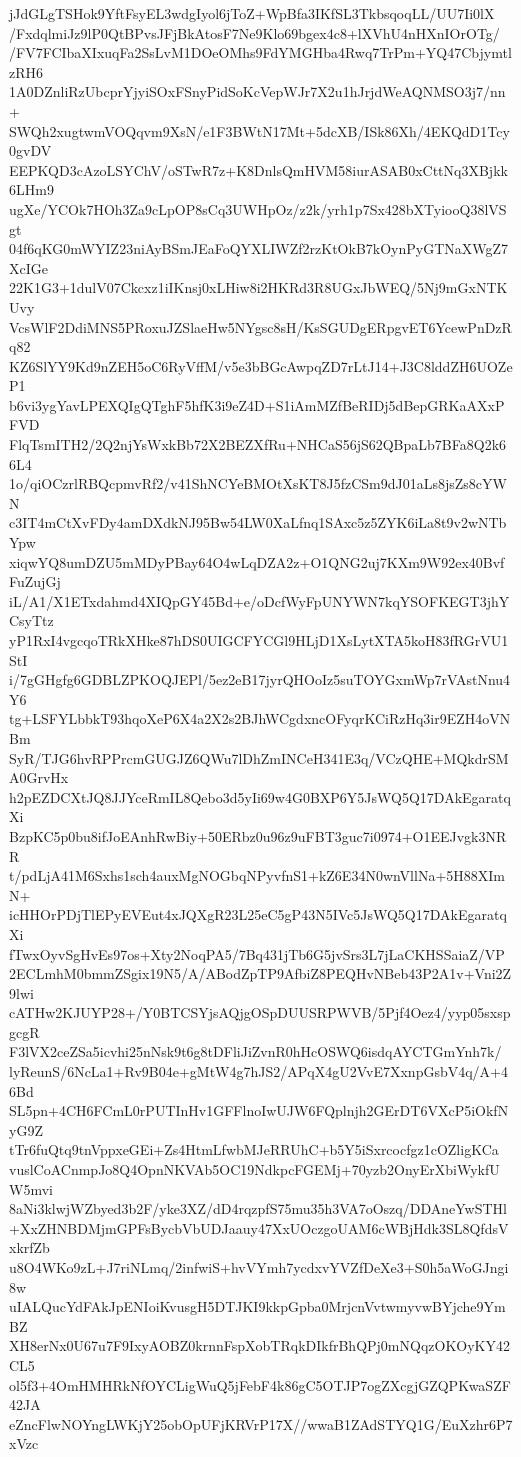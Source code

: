 jJdGLgTSHok9YftFsyEL3wdgIyol6jToZ+WpBfa3IKfSL3TkbsqoqLL/UU7Ii0lX
/FxdqlmiJz9lP0QtBPvsJFjBkAtosF7Ne9Klo69bgex4c8+lXVhU4nHXnIOrOTg/
/FV7FCIbaXIxuqFa2SsLvM1DOeOMhs9FdYMGHba4Rwq7TrPm+YQ47CbjymtlzRH6
1A0DZnliRzUbcprYjyiSOxFSnyPidSoKcVepWJr7X2u1hJrjdWeAQNMSO3j7/nn+
SWQh2xugtwmVOQqvm9XsN/e1F3BWtN17Mt+5dcXB/ISk86Xh/4EKQdD1Tcy0gvDV
EEPKQD3cAzoLSYChV/oSTwR7z+K8DnlsQmHVM58iurASAB0xCttNq3XBjkk6LHm9
ugXe/YCOk7HOh3Za9cLpOP8sCq3UWHpOz/z2k/yrh1p7Sx428bXTyiooQ38lVSgt
04f6qKG0mWYIZ23niAyBSmJEaFoQYXLIWZf2rzKtOkB7kOynPyGTNaXWgZ7XcIGe
22K1G3+1dulV07Ckcxz1iIKnsj0xLHiw8i2HKRd3R8UGxJbWEQ/5Nj9mGxNTKUvy
VcsWlF2DdiMNS5PRoxuJZSlaeHw5NYgsc8sH/KsSGUDgERpgvET6YcewPnDzRq82
KZ6SlYY9Kd9nZEH5oC6RyVffM/v5e3bBGcAwpqZD7rLtJ14+J3C8lddZH6UOZeP1
b6vi3ygYavLPEXQIgQTghF5hfK3i9eZ4D+S1iAmMZfBeRIDj5dBepGRKaAXxPFVD
FlqTsmITH2/2Q2njYsWxkBb72X2BEZXfRu+NHCaS56jS62QBpaLb7BFa8Q2k66L4
1o/qiOCzrlRBQcpmvRf2/v41ShNCYeBMOtXsKT8J5fzCSm9dJ01aLs8jsZs8cYWN
c3IT4mCtXvFDy4amDXdkNJ95Bw54LW0XaLfnq1SAxc5z5ZYK6iLa8t9v2wNTbYpw
xiqwYQ8umDZU5mMDyPBay64O4wLqDZA2z+O1QNG2uj7KXm9W92ex40BvfFuZujGj
iL/A1/X1ETxdahmd4XIQpGY45Bd+e/oDcfWyFpUNYWN7kqYSOFKEGT3jhYCsyTtz
yP1RxI4vgcqoTRkXHke87hDS0UIGCFYCGl9HLjD1XsLytXTA5koH83fRGrVU1StI
i/7gGHgfg6GDBLZPKOQJEPl/5ez2eB17jyrQHOoIz5suTOYGxmWp7rVAstNnu4Y6
tg+LSFYLbbkT93hqoXeP6X4a2X2s2BJhWCgdxncOFyqrKCiRzHq3ir9EZH4oVNBm
SyR/TJG6hvRPPrcmGUGJZ6QWu7lDhZmINCeH341E3q/VCzQHE+MQkdrSMA0GrvHx
h2pEZDCXtJQ8JJYceRmIL8Qebo3d5yIi69w4G0BXP6Y5JsWQ5Q17DAkEgaratqXi
BzpKC5p0bu8ifJoEAnhRwBiy+50ERbz0u96z9uFBT3guc7i0974+O1EEJvgk3NRR
t/pdLjA41M6Sxhs1sch4auxMgNOGbqNPyvfnS1+kZ6E34N0wnVllNa+5H88XImN+
icHHOrPDjTlEPyEVEut4xJQXgR23L25eC5gP43N5IVc5JsWQ5Q17DAkEgaratqXi
fTwxOyvSgHvEs97os+Xty2NoqPA5/7Bq431jTb6G5jvSrs3L7jLaCKHSSaiaZ/VP
2ECLmhM0bmmZSgix19N5/A/ABodZpTP9AfbiZ8PEQHvNBeb43P2A1v+Vni2Z9lwi
cATHw2KJUYP28+/Y0BTCSYjsAQjgOSpDUUSRPWVB/5Pjf4Oez4/yyp05sxspgcgR
F3lVX2ceZSa5icvhi25nNsk9t6g8tDFliJiZvnR0hHcOSWQ6isdqAYCTGmYnh7k/
lyReunS/6NcLa1+Rv9B04e+gMtW4g7hJS2/APqX4gU2VvE7XxnpGsbV4q/A+46Bd
SL5pn+4CH6FCmL0rPUTInHv1GFFlnoIwUJW6FQplnjh2GErDT6VXcP5iOkfNyG9Z
tTr6fuQtq9tnVppxeGEi+Zs4HtmLfwbMJeRRUhC+b5Y5iSxrcocfgz1cOZligKCa
vuslCoACnmpJo8Q4OpnNKVAb5OC19NdkpcFGEMj+70yzb2OnyErXbiWykfUW5mvi
8aNi3klwjWZbyed3b2F/yke3XZ/dD4rqzpfS75mu35h3VA7oOszq/DDAneYwSTHl
+XxZHNBDMjmGPFsBycbVbUDJaauy47XxUOczgoUAM6cWBjHdk3SL8QfdsVxkrfZb
u8O4WKo9zL+J7riNLmq/2infwiS+hvVYmh7ycdxvYVZfDeXe3+S0h5aWoGJngi8w
uIALQucYdFAkJpENIoiKvusgH5DTJKI9kkpGpba0MrjcnVvtwmyvwBYjche9YmBZ
XH8erNx0U67u7F9IxyAOBZ0krnnFspXobTRqkDIkfrBhQPj0mNQqzOKOyKY42CL5
ol5f3+4OmHMHRkNfOYCLigWuQ5jFebF4k86gC5OTJP7ogZXcgjGZQPKwaSZF42JA
eZncFlwNOYngLWKjY25obOpUFjKRVrP17X//wwaB1ZAdSTYQ1G/EuXzhr6P7xVzc
